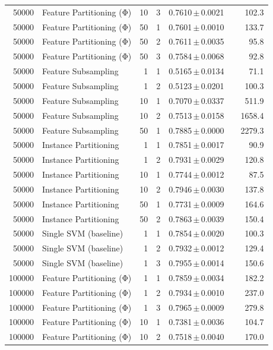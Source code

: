 \begin{table}[ht]
\begin{tabular}{rlrrccr}
50000 & Feature Partitioning (Φ) & 10 & 3 & 0.7610\,$\pm$\,0.0021 &  & 102.3 \\
50000 & Feature Partitioning (Φ) & 50 & 1 & 0.7601\,$\pm$\,0.0010 &  & 133.7 \\
50000 & Feature Partitioning (Φ) & 50 & 2 & 0.7611\,$\pm$\,0.0035 &  & 95.8 \\
50000 & Feature Partitioning (Φ) & 50 & 3 & 0.7584\,$\pm$\,0.0068 &  & 92.8 \\
50000 & Feature Subsampling & 1 & 1 & 0.5165\,$\pm$\,0.0134 &  & 71.1 \\
50000 & Feature Subsampling & 1 & 2 & 0.5123\,$\pm$\,0.0201 &  & 100.3 \\
50000 & Feature Subsampling & 10 & 1 & 0.7070\,$\pm$\,0.0337 &  & 511.9 \\
50000 & Feature Subsampling & 10 & 2 & 0.7513\,$\pm$\,0.0158 &  & 1658.4 \\
50000 & Feature Subsampling & 50 & 1 & 0.7885\,$\pm$\,0.0000 &  & 2279.3 \\
50000 & Instance Partitioning & 1 & 1 & 0.7851\,$\pm$\,0.0017 &  & 90.9 \\
50000 & Instance Partitioning & 1 & 2 & 0.7931\,$\pm$\,0.0029 &  & 120.8 \\
50000 & Instance Partitioning & 10 & 1 & 0.7744\,$\pm$\,0.0012 &  & 87.5 \\
50000 & Instance Partitioning & 10 & 2 & 0.7946\,$\pm$\,0.0030 &  & 137.8 \\
50000 & Instance Partitioning & 50 & 1 & 0.7731\,$\pm$\,0.0009 &  & 164.6 \\
50000 & Instance Partitioning & 50 & 2 & 0.7863\,$\pm$\,0.0039 &  & 150.4 \\
50000 & Single SVM (baseline) & 1 & 1 & 0.7854\,$\pm$\,0.0020 &  & 100.3 \\
50000 & Single SVM (baseline) & 1 & 2 & 0.7932\,$\pm$\,0.0012 &  & 129.4 \\
50000 & Single SVM (baseline) & 1 & 3 & 0.7955\,$\pm$\,0.0014 &  & 150.6 \\
100000 & Feature Partitioning (Φ) & 1 & 1 & 0.7859\,$\pm$\,0.0034 &  & 182.2 \\
100000 & Feature Partitioning (Φ) & 1 & 2 & 0.7934\,$\pm$\,0.0010 &  & 237.0 \\
100000 & Feature Partitioning (Φ) & 1 & 3 & 0.7965\,$\pm$\,0.0009 &  & 279.8 \\
100000 & Feature Partitioning (Φ) & 10 & 1 & 0.7381\,$\pm$\,0.0036 &  & 104.7 \\
100000 & Feature Partitioning (Φ) & 10 & 2 & 0.7518\,$\pm$\,0.0040 &  & 170.0 \\

\end{tabular}
\end{table}
